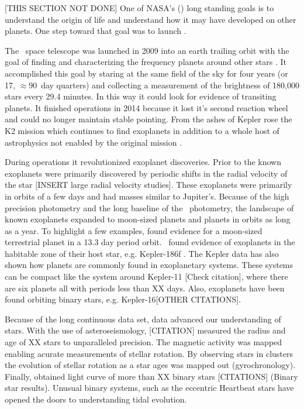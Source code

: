 [THIS SECTION NOT DONE]
One of NASA's () long standing goals is to understand the origin of life and understand how it may have developed on other planets. One step toward that goal was to launch \Kepler.


The \Kepler\ space telescope was launched in 2009 into an earth trailing orbit with the goal of finding and characterizing the frequency planets around other stars \citep{Koch2010,Lissauer2014}. It accomplished this goal by staring at the same field of the sky for four years (or 17, $\approx$90~day quarters) and collecting a measurement of the brightness of 180,000 stars every 29.4 minutes.  In this way it could look for evidence of transiting planets.  It finished operations in 2014 because it lost it's second reaction wheel and could no longer maintain stable pointing. From the ashes of Kepler rose the K2 mission\citet{Howell2014} which continues to find exoplanets in addition to a whole host of astrophysics not enabled by the original \Kepler{} mission \citep{}. 

During  operations it revolutionized exoplanet discoveries. Prior to \Kepler{,} the known exoplanets were primarily discovered by periodic shifts in the radial velocity of the star \citep{}[INSERT large radial velocity studies]. These exoplanets were primarily in orbits of a few days and had masses similar to Jupiter's.   Because of the high precision photometry and the long baseline of the \Kepler\ photometry, the landscape of known exoplanets expanded to moon-sized planets and planets in orbits as long as a year. To highlight a few examples, \citep{Barclay2013} found evidence for a moon-sized terrestrial planet in a 13.3 day period orbit. \Kepler\ found evidence of exoplanets in the habitable zone of their host star, e.g. Kepler-186f \citep{Quintana2014}. The Kepler data has also shown how planets are commonly found in exoplanetary systems. These systems can be compact like the system around Kepler-11 \citep{Lissauer2007}[Check citation], where there are six planets all with periods less than XX days. Also, exoplanets have been found orbiting binary stars, e.g. Kepler-16\citep{Doyle2011}[OTHER CITATIONS].

Because of the long continuous data set, \Kepler{} data advanced our understanding of stars. With the use of asteroseismology, \citet{}[CITATION] measured the radius and age of XX stars to unparalleled precision. The magnetic activity was mapped enabling acurate measurements of stellar rotation. By observing stars in clusters the evolution of stellar rotation as a star ages was mapped out (gyrochronology). Finally, \Kepler{} obtained light curve of more than XX binary stars \citep{Prsa2011,Kirk2016}[CITATIONS] (Binary star results). Unusual binary systems, such as the eccentric Heartbeat stars \citet{Welsh2011,Thompson2012} have opened the doors to understanding tidal evolution.

